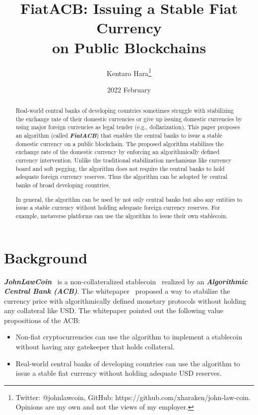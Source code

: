 \documentclass[dvipdfmx,a4paper]{article}
\title{\textbf{FiatACB: Issuing a Stable Fiat Currency\\on Public Blockchains}}
\author{Kentaro Hara\footnote{Twitter: @johnlawcoin, GitHub: https://github.com/xharaken/john-law-coin. Opinions are my own and not the views of my employer.}}
\date{2022 February}
\begin{document}
\maketitle

\begin{abstract}

Real-world central banks of developing countries sometimes struggle with stabilizing the exchange rate of their domestic currencies or give up issuing domestic currencies by using major foreign currencies as legal tender (e.g., dollarization). This paper proposes an algorithm (called \textit{\textbf{FiatACB}}) that enables the central banks to issue a stable domestic currency on a public blockchain. The proposed algorithm stabilizes the exchange rate of the domestic currency by enforcing an algorithmically defined currency intervention. Unlike the traditional stabilization mechanisms like currency board and soft pegging, the algorithm does not require the central banks to hold adequate foreign currency reserves. Thus the algorithm can be adopted by central banks of broad developing countries.

In general, the algorithm can be used by not only central banks but also any entities to issue a stable currency without holding adequate foreign currency reserves. For example, metaverse platforms can use the algorithm to issue their own stablecoin.

\end{abstract}

\section{Background}

\textit{\textbf{JohnLawCoin}}~\cite{johnlawcoin} is a non-collateralized stablecoin~\cite{arner2020stablecoins,moin2020sok} realized by an \textit{\textbf{Algorithmic Central Bank (ACB)}}. The whitepaper~\cite{johnlawcoin} proposed a way to stabilize the currency price with algorithmically defined monetary protocols without holding any collateral like USD. The whitepaper pointed out the following value propositions of the ACB:

\begin{itemize}
\item Non-fiat cryptocurrencies can use the algorithm to implement a stablecoin without having any gatekeeper that holds collateral.
\item Real-world central banks of developing countries can use the algorithm to issue a stable fiat currency without holding adequate USD reserves.
\end{itemize}
\end{document}
